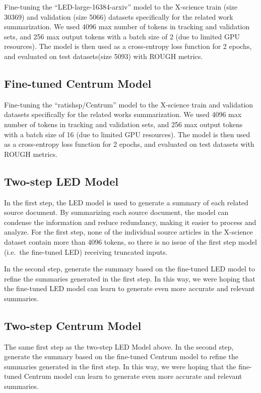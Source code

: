 \documentclass[12pt, twocolumn]{article}
\numberwithin{equation}{section}
\begin{document}
Fine-tuning the ``LED-large-16384-arxiv'' model to the X-science train (size 30369) and validation (size 5066) datasets specifically for the related work summarization. We used 4096 max number of tokens in tracking and validation sets, and 256 max output tokens with a batch size of 2 (due to limited GPU resources). The model is then used as a cross-entropy loss function for 2 epochs, and evaluated on test datasets(size 5093) with ROUGH metrics. 

\subsection{Fine-tuned Centrum Model}
\label{app:model-ft-centrum}

Fine-tuning the ``ratishsp/Centrum'' model to the X-science train and validation datasets specifically for the related works summarization. We used 4096 max number of tokens in tracking and validation sets, and 256 max output tokens with a batch size of 16 (due to limited GPU resources). The model is then used as a cross-entropy loss function for 2 epochs, and evaluated on test datasets with ROUGH metrics. 

\subsection{Two-step LED Model}
\label{app:model-two-step-led}

In the first step, the LED model is used to generate a summary of each related source document. By summarizing each source document, the model can condense the information and reduce redundancy, making it easier to process and analyze. For the first step, none of the individual source articles in the X-science dataset contain more than 4096 tokens, so there is no issue of the first step model (i.e.~the fine-tuned LED) receiving truncated inputs.

In the second step, generate the summary based on the fine-tuned LED model to refine the summaries generated in the first step. In this way, we were hoping that the fine-tuned LED model can learn to generate even more accurate and relevant summaries.

\subsection{Two-step Centrum Model}
\label{app:model-two-step-centrum}

The same first step as the two-step LED Model above. In the second step, generate the summary based on the fine-tuned Centrum model to refine the summaries generated in the first step. In this way, we were hoping that the fine-tuned Centrum model can learn to generate even more accurate and relevant summaries.
\end{document}
